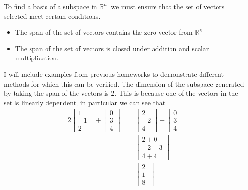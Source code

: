\documentclass{report}
\begin{document}
\noindent To find a basis of a subspace in $\mathbb{R}^n$,  we must ensure that the set of vectors selected meet certain conditions.
\begin{itemize}
\item The span of the set of vectors contains the zero vector from $\mathbb{R}^n$
\item The span of the set of vectors is closed under addition and scalar multiplication.
\end{itemize}
I will include examples from previous homeworks to demonstrate different methods for which this can be verified. 
\sol The dimension of the subspace generated by taking the span of the vectors is 2. This is because one of the vectors in the set is linearly dependent, in particular we can see that
$$
\begin{aligned}
	2 \begin{bmatrix} 1 \\ -1 \\ 2 \end{bmatrix} +
	\begin{bmatrix} 0 \\ 3 \\ 4 \end{bmatrix}  & =
	\begin{bmatrix} 2 \\ -2 \\ 4 \end{bmatrix} +
	\begin{bmatrix} 0 \\ 3 \\ 4 \end{bmatrix} \\
	& = \begin{bmatrix} 2 + 0 \\ -2 + 3 \\ 4 + 4 \end{bmatrix} \\
	& = \begin{bmatrix} 2 \\ 1 \\ 8 \ \end{bmatrix}
\end{aligned}
$$
\end{document}

